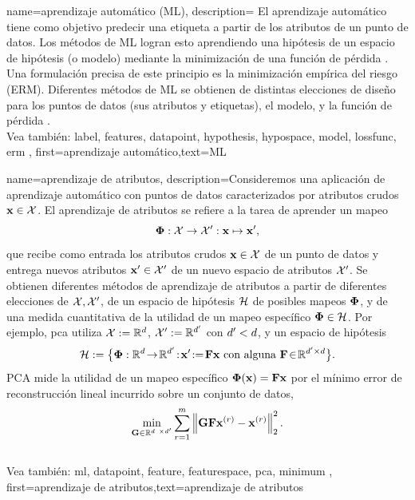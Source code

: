 {name={aprendizaje automático (ML)},
	description={
		El aprendizaje automático tiene como objetivo predecir
		una etiqueta a partir de los atributos de un punto de datos. Los métodos de ML logran esto
		aprendiendo una hipótesis de un espacio de hipótesis (o modelo)
		mediante la minimización de una función de pérdida \cite{MLBasics,HastieWainwrightBook}.
		Una formulación precisa de este principio es la minimización empírica del riesgo (ERM).
		Diferentes métodos de ML se obtienen de distintas elecciones de diseño para los
		puntos de datos (sus atributos y etiquetas),
		el modelo, y la función de pérdida \cite[Cap. 3]{MLBasics}.
		\\
		Vea también: \gls{label}, \gls{feature}s, \gls{datapoint}, \gls{hypothesis}, \gls{hypospace}, \gls{model}, \gls{lossfunc}, \gls{erm} },
	first={aprendizaje automático},text={ML}
}


{name={aprendizaje de atributos},
	description={Consideremos una aplicación de aprendizaje automático con puntos de datos caracterizados por 
	atributos crudos ${\bf x} \in \mathcal{X}$. El aprendizaje de atributos
	se refiere a la tarea de aprender un mapeo
		$${\bf \Phi}: \mathcal{X} \rightarrow \mathcal{X}': {\bf x} \mapsto {\bf x}',$$ 
		que recibe como entrada los atributos crudos ${\bf x} \in \mathcal{X}$ de un punto de datos y entrega nuevos
		atributos ${\bf x}' \in \mathcal{X}'$ de un nuevo espacio de atributos $\mathcal{X}'$. 
		Se obtienen diferentes métodos de aprendizaje de atributos a partir de diferentes elecciones de 
		$\mathcal{X},\mathcal{X}'$, de un espacio de hipótesis $\mathcal{H}$ de posibles mapeos ${\bf \Phi}$, 
		y de una medida cuantitativa de la utilidad de un mapeo específico ${\bf \Phi} \in \mathcal{H}$. Por ejemplo, pca utiliza $\mathcal{X} := \mathbb{R}^{d}$, $\mathcal{X}' := \mathbb{R}^{d'}$
		con $d' < d$, y un espacio de hipótesis
		$$\hypospace\defeq \big\{ \featuremapvec: \mathbb{R}^{\dimlocalmodel}
		\!\rightarrow\! \mathbb{R}^{\dimlocalmodel'}\!:\!\featurevec'\!\defeq\!\mF \featurevec \mbox{ con alguna } \mF \!\in\! \mathbb{R}^{\dimlocalmodel' \times \dimlocalmodel} \big\}.$$ PCA mide la utilidad de un mapeo específico ${\bf \Phi}({\bf x})= \mathbf{F} {\bf x}$ 
		por el mínimo error de reconstrucción lineal incurrido sobre un conjunto de datos, 
	$$ \min_{\mG \in \mathbb{R}^{\dimlocalmodel \times \dimlocalmodel'}} \sum_{\sampleidx=1}^{\samplesize} \normgeneric{\mG \mF \featurevec^{(\sampleidx)} - \featurevec^{(\sampleidx)}}{2}^{2}.$$ 
	\\
		Vea también: \gls{ml}, \gls{datapoint}, \gls{feature}, \gls{featurespace}, \gls{pca}, \gls{minimum} }, 
	first={aprendizaje de atributos},text={aprendizaje de atributos}
} 

